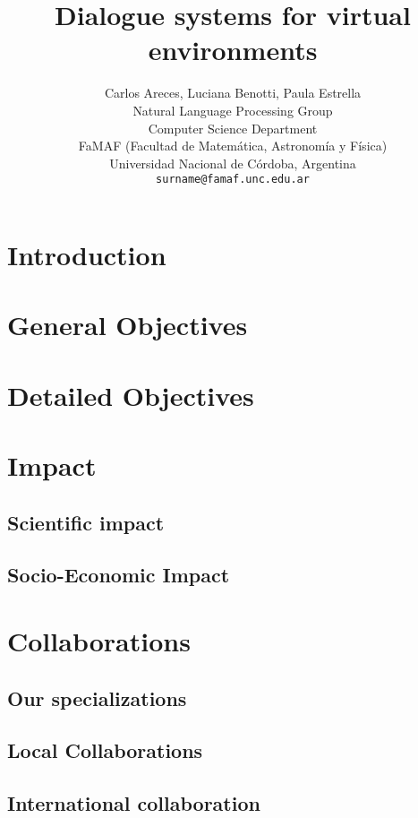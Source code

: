 \documentclass[11pt,letterpaper]{article}
\title{Dialogue systems for virtual environments}
\author{Carlos Areces, Luciana Benotti, Paula Estrella \\
 Natural Language Processing Group \\
Computer Science Department \\
FaMAF (Facultad de Matem\'atica, Astronom\'ia y F\'isica) \\
Universidad Nacional de C\'ordoba, Argentina \\
  {\tt surname@famaf.unc.edu.ar}
}
\date{}
\begin{document}
\maketitle
\begin{abstract}
\end{abstract}

\section{Introduction}




\section{General Objectives}



\section{Detailed Objectives}




\section{Impact}

\subsection{Scientific impact}



\subsection{Socio-Economic Impact}



\section{Collaborations}

\subsection{Our specializations}



\subsection{Local Collaborations}



\subsection{International collaboration}





\end{document}
